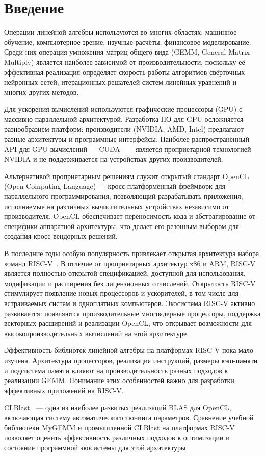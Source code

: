
\section*{Введение}
\thispagestyle{withCompileDate}

Операции линейной алгебры используются во многих областях: машинное обучение, компьютерное зрение, научные расчёты, финансовое моделирование. Среди них операция умножения матриц общего вида (GEMM, General Matrix Multiply) является наиболее зависимой от производительности, поскольку её эффективная реализация определяет скорость работы алгоритмов свёрточных нейронных сетей, итерационных решателей систем линейных уравнений и многих других методов.

Для ускорения вычислений используются графические процессоры (GPU) с массивно-параллельной архитектурой. Разработка ПО для GPU осложняется разнообразием платформ: производители (NVIDIA, AMD, Intel) предлагают разные архитектуры и программные интерфейсы. Наиболее распространённый API для GPU вычислений --- CUDA~\cite{nickolls2008cuda} --- является проприетарной технологией NVIDIA и не поддерживается на устройствах других производителей.

Альтернативой проприетарным решениям служит открытый стандарт OpenCL~\cite{opencl_spec} (Open Computing Language) --- кросс-платформенный фреймворк для параллельного программирования, позволяющий разрабатывать приложения, исполняемые на различных вычислительных устройствах независимо от производителя. OpenCL обеспечивает переносимость кода и абстрагирование от специфики аппаратной архитектуры, что делает его резонным выбором для создания кросс-вендорных решений.

В последние годы особую популярность привлекает открытая архитектура набора команд RISC-V~\cite{waterman2014risc}. В отличие от проприетарных архитектур x86 и ARM, RISC-V является полностью открытой спецификацией, доступной для использования, модификации и расширения без лицензионных отчислений. Открытость RISC-V стимулирует появление новых процессоров и ускорителей, в том числе для встраиваемых систем и одноплатных компьютеров. Экосистема RISC-V активно развивается: появляются производительные многоядерные процессоры, поддержка векторных расширений и реализации OpenCL, что открывает возможности для высокопроизводительных вычислений на этой архитектуре.

Эффективность библиотек линейной алгебры на платформах RISC-V пока мало изучена. Архитектура процессоров, реализация инструкций, размеры кэш-памяти и подсистема памяти влияют на производительность разных подходов к реализации GEMM. Понимание этих особенностей важно для разработки эффективных приложений на RISC-V.

CLBlast~\cite{clblast} — одна из наиболее развитых реализаций BLAS для OpenCL, включающая систему автоматического тюнинга параметров. Сравнение учебной библиотеки MyGEMM и промышленной CLBlast на платформах RISC-V позволяет оценить эффективность различных подходов к оптимизации и состояние программной экосистемы для этой архитектуры.
